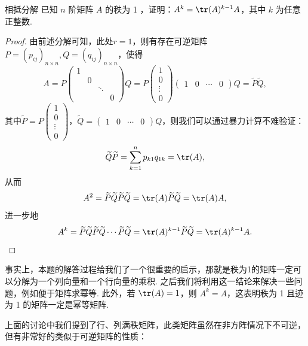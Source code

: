 \begin{example}{}{相抵分解}
    已知 $n$ 阶矩阵 $A$ 的秩为 1 ，证明：$A^k=\tr(A)^{k-1}A$，其中 $k$ 为任意正整数.
\end{example}

\begin{proof}
    由前述分解可知，此处$r=1$，则有存在可逆矩阵 $P=(p_{ij})_{n \times n},Q=(q_{ij})_{n \times n}$，使得
    \[A=P\begin{pmatrix}
            1 &   &        &   \\
              & 0 &        &   \\
              &   & \ddots &   \\
              &   &        & 0
        \end{pmatrix} Q=P\begin{pmatrix}
            1 \\ 0 \\ \vdots \\ 0
        \end{pmatrix}\begin{pmatrix}
            1 & 0 & \cdots & 0
        \end{pmatrix} Q=\widetilde{P} \widetilde{Q},\]
    其中$\widetilde{P}=P\begin{pmatrix}
            1 \\ 0 \\ \vdots \\ 0
        \end{pmatrix}$，$\widetilde{Q}=\begin{pmatrix}
            1 & 0 & \cdots & 0
        \end{pmatrix} Q$，则我们可以通过暴力计算不难验证：
    \[\widetilde{Q} \widetilde{P}=\sum_{k=1}^{n} p_{k1} q_{1k}=\tr(A),\]
    从而
    \[A^{2}=\widetilde{P} \widetilde{Q} \widetilde{P} \widetilde{Q}=\tr(A) \widetilde{P} \widetilde{Q}=\tr(A) A,\]
    进一步地
    \[A^{k}=\widetilde{P} \widetilde{Q} \widetilde{P} \widetilde{Q} \cdots \widetilde{P} \widetilde{Q}=\tr(A)^{k-1} \widetilde{P} \widetilde{Q}=\tr(A)^{k-1} A. \qedhere\]
\end{proof}

事实上，本题的解答过程给我们了一个很重要的启示，那就是秩为1的矩阵一定可以分解为一个列向量和一个行向量的乘积. 之后我们将利用这一结论来解决一些问题，例如便于矩阵求幂等. 此外，若 $\tr(A) = 1$，则 $A^k = A$，这表明秩为 1 且迹为 1 的矩阵一定是幂等矩阵.

上面的讨论中我们提到了行、列满秩矩阵，此类矩阵虽然在非方阵情况下不可逆，但有非常好的类似于可逆矩阵的性质：

